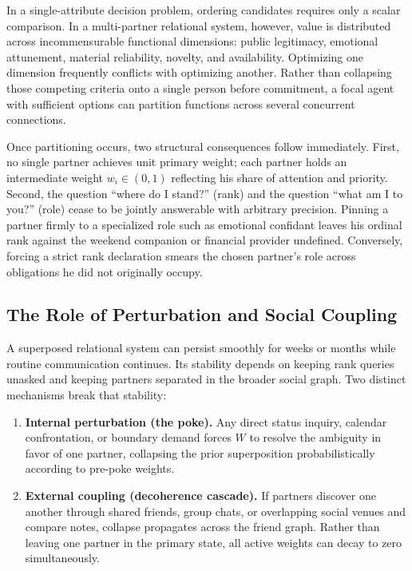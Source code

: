 In a single-attribute decision problem, ordering candidates requires only a scalar
comparison. In a multi-partner relational system, however, value is distributed
across incommensurable functional dimensions: public legitimacy, emotional
attunement, material reliability, novelty, and availability. Optimizing one
dimension frequently conflicts with optimizing another. Rather than collapsing
those competing criteria onto a single person before commitment, a focal agent
with sufficient options can partition functions across several concurrent
connections.

Once partitioning occurs, two structural consequences follow immediately. First,
no single partner achieves unit primary weight; each partner holds an intermediate
weight $w_i \in (0, 1)$ reflecting his share of attention and priority. Second,
the question ``where do I stand?'' (rank) and the question ``what am I to you?''
(role) cease to be jointly answerable with arbitrary precision. Pinning a partner
firmly to a specialized role such as emotional confidant leaves his ordinal rank
against the weekend companion or financial provider undefined. Conversely, forcing
a strict rank declaration smears the chosen partner's role across obligations he
did not originally occupy.

\subsection{The Role of Perturbation and Social Coupling}
\label{subsec:intro-perturbation}

A superposed relational system can persist smoothly for weeks or months while
routine communication continues. Its stability depends on keeping rank queries
unasked and keeping partners separated in the broader social graph. Two distinct
mechanisms break that stability:

\begin{enumerate}[nosep]
  \item \textbf{Internal perturbation (the poke).} Any direct status inquiry,
        calendar confrontation, or boundary demand forces $W$ to resolve the
        ambiguity in favor of one partner, collapsing the prior superposition
        probabilistically according to pre-poke weights.
  \item \textbf{External coupling (decoherence cascade).} If partners discover
        one another through shared friends, group chats, or overlapping social
        venues and compare notes, collapse propagates across the friend graph.
        Rather than leaving one partner in the primary state, all active weights
        can decay to zero simultaneously.
\end{enumerate}

